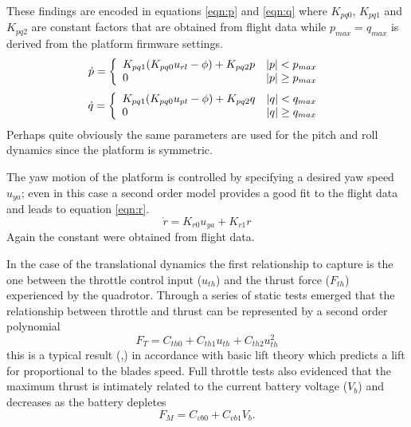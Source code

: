 \documentclass[a4paper,11pt]{report}
\begin{document}
These findings are encoded in equations \ref{eqn:p} and \ref{eqn:q} where $K_{pq0}$, $K_{pq1}$ and $K_{pq2}$ are constant factors that are obtained from flight data while $p_{max}=q_{max}$ is derived from the platform firmware settings.
\begin{equation}\label{eqn:p}
\dot{p}  =  \left\{ \begin{array}{l l} K_{pq1} (K_{pq0} u_{rl} - \phi) + K_{pq2} p & |p|<p_{max} \\ 0  & |p|\geq p_{max} \end{array} \right .\\
\end{equation}
\begin{equation}\label{eqn:q}
\dot{q}  =  \left\{ \begin{array}{l l} K_{pq1} (K_{pq0} u_{pt} - \phi) + K_{pq2} q & |q|<q_{max} \\ 0  & |q|\geq q_{max} \end{array} \right .\\
\end{equation}
Perhaps quite obviously the same parameters are used for the pitch and roll dynamics since the platform is symmetric. 


The yaw motion of the platform is controlled by specifying a desired yaw speed $u_{ya}$; even in this case a second order model provides a good fit to the flight data and leads to equation \ref{eqn:r}. 
\begin{equation}\label{eqn:r}
\dot{r} = K_{r0} u_{ya} + K_{r1} r
\end{equation}
Again the constant were obtained from flight data. 

In the case of the translational dynamics the first relationship to capture is the one between the throttle control input ($u_{th}$) and the thrust force ($F_{th}$) experienced by the quadrotor. 
Through a series of static tests emerged that the relationship between throttle and thrust can be represented by a second order polynomial 
\begin{equation}
F_T = C_{th0} + C_{th1} u_{th} + C_{th2} u^2_{th} \label{eqn:ft}
\end{equation}
 this is a typical result (\cite{denardi2010phd},\cite{hoffmann07quadrotor}) in accordance with basic lift theory which predicts a lift for proportional to the blades speed.
Full throttle tests also evidenced that the maximum thrust is intimately related to the current battery voltage ($V_b$) and decreases as the battery depletes 
\begin{equation}
F_M = C_{vb0}+C_{vb1} V_b \label{eqn:fm}.
\end{equation}
\end{document}
